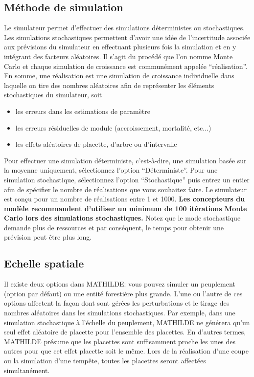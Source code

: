 \documentclass[a4paper,12pt]{article}
\begin{document}
\subsection{Méthode de simulation}

Le simulateur permet d'effectuer des simulations déterministes ou stochastiques. Les simulations stochastiques permettent d'avoir une idée de l'incertitude associée aux prévisions du simulateur en effectuant plusieurs fois la simulation et en y intégrant des facteurs aléatoires. Il s'agit du procédé que l'on nomme Monte Carlo et chaque simulation de croissance est communément appelée ``réalisation''. En somme, une réalisation est une simulation de croissance individuelle dans laquelle on tire des nombres aléatoires afin de représenter les éléments stochastiques du simulateur, soit

\begin{itemize}
	\item les erreurs dans les estimations de paramètre
  	\item les erreurs résiduelles de module (accroissement, mortalité, etc...)
  	\item les effets aléatoires de placette, d'arbre ou d'intervalle
\end{itemize}

Pour effectuer une simulation déterministe, c'est-à-dire, une simulation basée sur la moyenne uniquement, sélectionnez l'option ``Déterministe''. Pour une simulation stochastique, sélectionnez l'option ``Stochastique'' puis entrez un entier afin de spécifier le nombre de réalisations que vous souhaitez faire. Le simulateur est conçu pour un nombre de réalisations entre 1 et 1000. \textbf{Les concepteurs du modèle recommandent d'utiliser un minimum de 100 itérations Monte Carlo lors des simulations stochastiques.} Notez que le mode stochastique demande plus de ressources et par conséquent, le temps pour obtenir une prévision peut être plus long.

\subsection{Echelle spatiale}

Il existe deux options dans MATHILDE: vous pouvez simuler un peuplement (option par défaut) ou une entité forestière plus grande. L'une ou l'autre de ces options affectent la façon dont sont gérées les perturbations et le tirage des nombres aléatoires dans les simulations stochastiques. Par exemple, dans une simulation stochastique à l'échelle du peuplement, MATHILDE ne générera qu'un seul effet aléatoire de placette pour l'ensemble des placettes. En d'autres termes, MATHILDE présume que les placettes sont suffisamment proche les unes des autres pour que cet effet placette soit le même. Lors de la réalisation d'une coupe ou la simulation d'une tempête, toutes les placettes seront affectées simultanément. 
\end{document}

